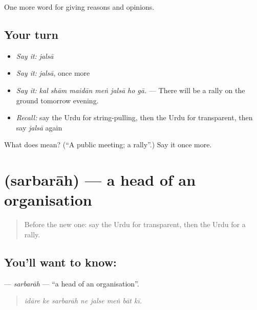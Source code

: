 \begin{grammarlens}[title={What you've built}]
One more word for giving reasons and opinions.
\end{grammarlens}

\subsection*{Your turn}
\begin{itemize}
\raggedright
  \item \emph{Say it:} \emph{jalsā}
  \item \emph{Say it:} \emph{jalsā}, once more
  \item \emph{Say it:} \emph{kal shām maidān meṅ jalsā ho gā.} — There will be a rally on the ground tomorrow evening.
  \item \emph{Recall:} say the Urdu for string-pulling, then the Urdu for transparent, then say \emph{jalsā} again
\end{itemize}

\begin{tcolorbox}[breakable,colback=teal!4,colframe=teal!35!black,title={Before you move on}]
What does  mean? (\textquotedblleft{}A public meeting; a rally\textquotedblright{}.) Say it once more.
\end{tcolorbox}
\section[\texorpdfstring{\ur{سربراہ} (sarbarāh)}{سربراہ (sarbarāh)}]{ (sarbarāh) — a head of an organisation}

\label{lesson:UR-C358-sarbarah}



\begin{quote}
Before the new one: say the Urdu for transparent, then the Urdu for a rally.
\end{quote}

\subsection*{You'll want to know: }
\textbf{} — \emph{sarbarāh} — \textquotedblleft{}a head of an organisation\textquotedblright{}.

\begin{quote}
       
\end{quote}

\begin{quote}
\emph{idāre ke sarbarāh ne jalse meṅ bāt kī.}
\end{quote}

